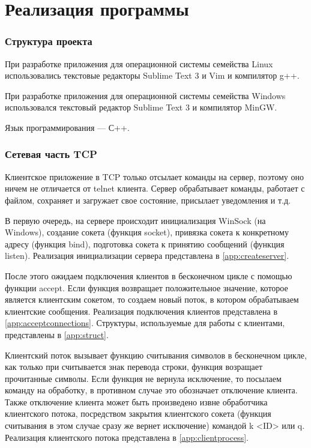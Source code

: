 \section{Реализация программы}

\subsubsection{Структура проекта}

При разработке приложения для операционной системы семейства Linux использовались текстовые редакторы Sublime Text 3 и Vim и компилятор g++.

При разработке приложения для операционной системы семейства Windows использовался текстовый редактор Sublime Text 3 и компилятор MinGW.

Язык программирования --- С++.

\subsubsection{Сетевая часть TCP}

Клиентское приложение в TCP только отсылает команды на сервер, поэтому оно ничем не отличается от telnet клиента. Сервер обрабатывает команды, работает с файлом, сохраняет и загружает свое состояние, присылает уведомления и т.д.

В первую очередь, на сервере происходит инициализация WinSock (на Windows), создание сокета (функция socket), привязка сокета к конкретному адресу (функция bind), подготовка сокета к принятию сообщений (функция listen). Реализация инициализации сервера представлена в \vref{app:createserver}.

После этого ожидаем подключения клиентов в бесконечном цикле с помощью функции accept. Если функция возвращает положительное значение, которое является клиентским сокетом, то создаем новый поток, в котором обрабатываем клиентские сообщения. Реализация подключения клиентов представлена в \vref{app:acceptconnections}. Структуры, используемые для работы с клиентами, представлены в \vref{app:struct}.

Клиентский поток вызывает функцию считывания символов в бесконечном цикле, как только при считывается знак перевода строки, функция возращает прочитанные символы. Если функция не вернула исключение, то посылаем команду на обработку, в противном случае это обозначает отключение клиента. Также отключение клиента может быть произведено извне обработчика клиентского потока, посредством закрытия клиентского сокета (функция считывания в этом случае сразу же вернет исключение) командой k <ID> или q. Реализация клиентского потока представлена в \vref{app:clientprocess}.

